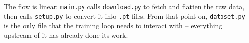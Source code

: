\documentclass[11pt, a4paper]{article}
\begin{document}
The flow is linear: \texttt{main.py} calls \texttt{download.py} to fetch and
flatten the raw data, then calls \texttt{setup.py} to convert it into
\texttt{.pt} files. From that point on, \texttt{dataset.py} is the only file
that the training loop needs to interact with -- everything upstream of it has
already done its work.
\end{document}
